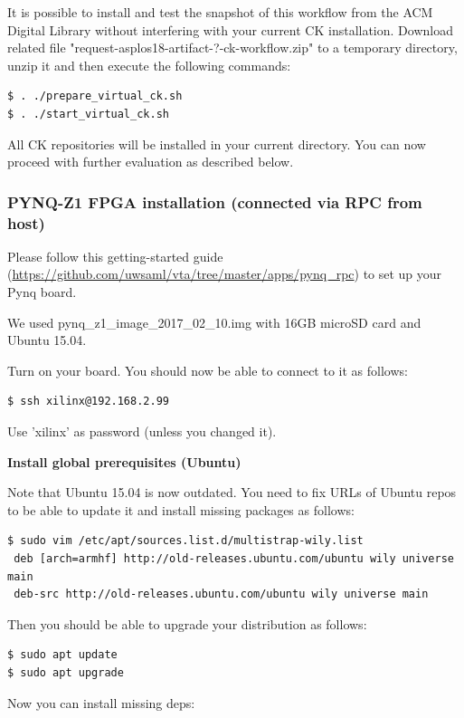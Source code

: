 \documentclass[sigconf]{acmart}
\begin{document}
It is possible to install and test the snapshot of this workflow 
from the ACM Digital Library without interfering with your current CK installation.
Download related file "request-asplos18-artifact-?-ck-workflow.zip"
to a temporary directory, unzip it and then execute the following commands:

\begin{verbatim}
$ . ./prepare_virtual_ck.sh
$ . ./start_virtual_ck.sh
\end{verbatim}

All CK repositories will be installed in your current directory.
You can now proceed with further evaluation as described below.

\subsubsection{PYNQ-Z1 FPGA installation (connected via RPC from host)}

Please follow this getting-started guide (\url{https://github.com/uwsaml/vta/tree/master/apps/pynq_rpc}) to set up your Pynq board.

We used pynq\_z1\_image\_2017\_02\_10.img with 16GB microSD card and Ubuntu 15.04.

Turn on your board. You should now be able to connect to it as follows:

\begin{verbatim}
$ ssh xilinx@192.168.2.99
\end{verbatim}

Use 'xilinx' as password (unless you changed it).

\textbf{Install global prerequisites (Ubuntu)}

Note that Ubuntu 15.04 is now outdated. You need to fix URLs of Ubuntu repos to be able to update it and install missing packages as follows:

\begin{verbatim}
$ sudo vim /etc/apt/sources.list.d/multistrap-wily.list
 deb [arch=armhf] http://old-releases.ubuntu.com/ubuntu wily universe main
 deb-src http://old-releases.ubuntu.com/ubuntu wily universe main
\end{verbatim}

Then you should be able to upgrade your distribution as follows:

\begin{verbatim}
$ sudo apt update
$ sudo apt upgrade
\end{verbatim}

Now you can install missing deps:
\end{document}
